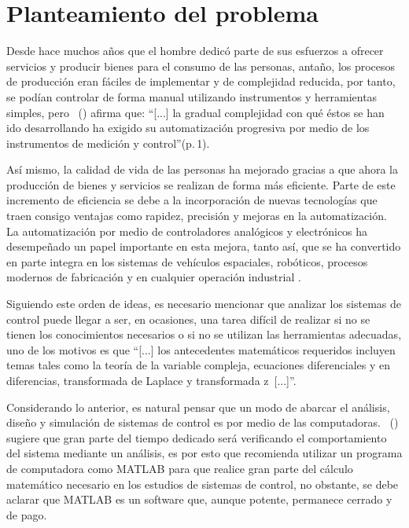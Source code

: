 \section{Planteamiento del problema}
	Desde hace muchos años que el hombre dedicó parte de sus esfuerzos a ofrecer servicios y producir bienes para el consumo de las personas, antaño, los procesos de producción eran fáciles de implementar y de complejidad reducida, por tanto, se podían controlar de forma manual utilizando instrumentos y herramientas simples, pero \citeauthor{creus2010instrumentacion}~(\citeyear{creus2010instrumentacion}) afirma que: \enquote{[...] la gradual complejidad con qué éstos se han ido desarrollando ha exigido su automatización progresiva por medio de los instrumentos de medición y control}(p.$\,$1).
	
	Así mismo, la calidad de vida de las personas ha mejorado gracias a que ahora la producción de bienes y servicios se realizan de forma más eficiente. Parte de este incremento de eficiencia se debe a la incorporación de nuevas tecnologías que traen consigo ventajas como rapidez, precisión y mejoras en la automatización. La automatización por medio de controladores analógicos y electrónicos ha desempeñado un papel importante en esta mejora, tanto así, que se ha convertido en parte integra en los sistemas de vehículos espaciales, robóticos, procesos modernos de fabricación y en cualquier operación industrial \Parencite{ogata2003ingenieria}.
		
	Siguiendo este orden de ideas, es necesario mencionar que analizar los sistemas de control puede llegar a ser, en ocasiones, una tarea difícil de realizar si no se tienen los conocimientos necesarios o si no se utilizan las herramientas adecuadas, uno de los motivos es que \enquote{[...] los antecedentes matemáticos requeridos incluyen temas tales como la teoría de la variable compleja, ecuaciones diferenciales y en diferencias, transformada de Laplace y transformada z~[...]}\parencite[p.$\,$21]{kuo1996sistemas}.
	
	Considerando lo anterior, es natural pensar que un modo de abarcar el análisis, diseño y simulación de sistemas de control es por medio de las computadoras. \citeauthor{ogata2003ingenieria}~(\citeyear{ogata2003ingenieria}) sugiere que gran parte del tiempo dedicado será verificando el comportamiento del sistema mediante un análisis, es por esto que recomienda utilizar un programa de computadora como MATLAB para que realice gran parte del cálculo matemático necesario en los estudios de sistemas de control, no obstante, se debe aclarar que MATLAB es un software que, aunque potente, permanece cerrado y de pago.
	
